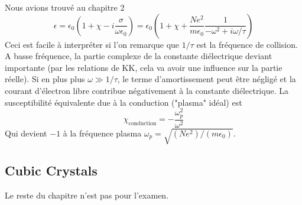 Nous avions trouvé au chapitre 2
\begin{equation}
\epsilon = \epsilon_0\left(1+\chi-i\dfrac{\sigma}{\omega\epsilon_0}\right) = \epsilon_0\left(1+\chi+
\dfrac{Ne^2}{m\epsilon_0}\dfrac{1}{-\omega^2+i\omega/\tau}\right)
\end{equation}
Ceci est facile à interpréter si l'on 
remarque que $1/\tau$ est la fréquence de collision. A basse fréquence, la partie complexe de la constante
diélectrique deviant importante (par les relations de KK, cela va avoir une influence sur la partie réelle). Si en plus plus $\omega \gg 1/\tau$, le terme d'amortissement peut être
négligé et la courant d'électron libre contribue négativement à la constante diélectrique. La susceptibilité
équivalente due à la conduction ("plasma" idéal) est 
\begin{equation}
\chi_{\text{conduction}} = -\dfrac{\omega_p^2}{\omega^2}
\end{equation}
Qui devient $-1$ à la fréquence plasma $\omega_p = \sqrt{(Ne^2	)/(m\epsilon_0)}$.




\subsection{Cubic Crystals}
Le reste du chapitre n'est pas pour l'examen.






























